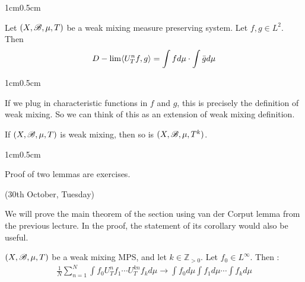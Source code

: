 \documentclass[12pt,a4paper]{report}
\newenvironment{proof}
{\begin{changemargin}{1cm}{0.5cm} 
	}%
	{\end{changemargin}
}
\begin{document}
\begin{proof}
\eop
\end{proof}
\s

\lem Let $(X,\mathscr{B}, \mu, T)$ be a weak mixing measure preserving system. Let $f,g\in L^2$. Then
\begin{align*}
D-\lim \langle U^n_T f,g\rangle = \int f d\mu \cdot \int \bar{g} d\mu 
\end{align*}
\begin{proof}
If we plug in characteristic functions in $f$ and $g$, this is precisely the definition of weak mixing. So we can think of this as an extension of weak mixing definition.
\end{proof}

\lem If $(X,\mathscr{B}, \mu, T)$ is weak mixing, then so is $(X,\mathscr{B}, \mu, T^k)$.
\begin{proof}
\pf Proof of two lemmas are exercises.
\end{proof}
\s

\newday

(30th October, Tuesday)
\s

We will prove the main theorem of the section using van der Corput lemma from the previous lecture. In the proof, the statement of its corollary would also be useful.
\s

\cor  $(X,\mathscr{B}, \mu, T)$ be a weak mixing MPS, and let $k\in \mathbb{Z}_{>0}$. Let $f_0 \in L^{\infty}$. Then :
\begin{align*}
\frac{1}{N} \sum_{n=1}^N \int f_0 U^n_T f_1 \cdots U^{kn}_T f_k d\mu \rightarrow \int f_0 d\mu \int f_1 d\mu \cdots \int f_k d\mu
\end{align*}
\s
\end{document}
